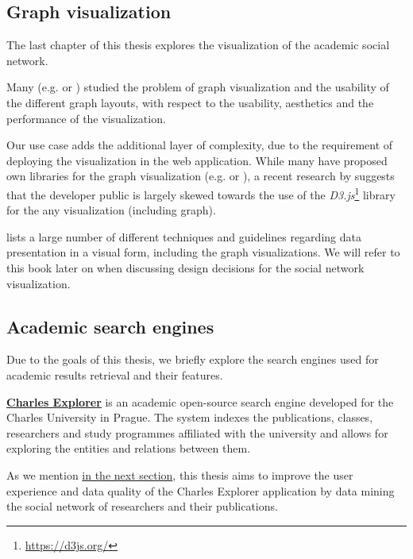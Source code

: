 \subsection*{Graph visualization}

The last chapter of this thesis explores the visualization of the academic social network.

Many (e.g. \cite{aesthetics-graph} or \cite{cgv-graph}) studied the problem of graph visualization and the usability of the different graph layouts,
with respect to the usability, aesthetics and the performance of the visualization.

Our use case adds the additional layer of complexity, due to the requirement of deploying the visualization in the web application.
While many have proposed own libraries for the graph visualization (e.g. \cite{wigis} or \cite{franz2016cytoscape}),
a recent research by \cite{Greif_Burel_2024} suggests that the developer public is largely skewed towards the use of the \textit{D3.js}\footnote{\url{https://d3js.org/}}
library for the any visualization (including graph).

\cite{10.5555/2385879} lists a large number of different techniques and guidelines regarding 
data presentation in a visual form, including the graph visualizations.
We will refer to this book later on when discussing design decisions for the social network visualization.

\subsection*{Academic search engines}

Due to the goals of this thesis, we briefly explore the search engines used for academic results retrieval and their features.

\textbf{\href{https://explorer.cuni.cz}{Charles Explorer}} is an academic open-source search engine developed for the Charles University in Prague.
The system indexes the publications, classes, researchers and study programmes affiliated with the university and allows for exploring the entities and relations between them.

As we mention \hyperref[sec:goals]{in the next section}, this thesis aims to improve the user experience and data quality of the Charles Explorer application by data mining the social network of researchers and their publications.

